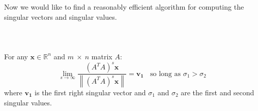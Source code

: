 \documentclass{tufte-handout}
\newcommand{\norm}[1]{\left\lVert#1\right\rVert}
\begin{document}
\noindent Now we would like to find a reasonably efficient algorithm for computing the singular vectors and singular values.\\\leavevmode\\

\\\leavevmode\\
\noindent For any $\mathbf{x}\in\mathbb{R}^n$ and $m~\times~n$ matrix $A$:
\[
\lim_{s\rightarrow\infty}\frac{(A^TA)^s\mathbf{x}}{\norm{(A^TA)^s\mathbf{x}}}
=\mathbf{v_1}~~~~\text{so long as }\sigma_{1}>\sigma_{2}
\]
where $\mathbf{v_1}$ is the first right singular vector and $\sigma_{1}$ and $\sigma_{2}$ are the first and second singular values.\\\leavevmode\\
\\\leavevmode\\
\end{document}
